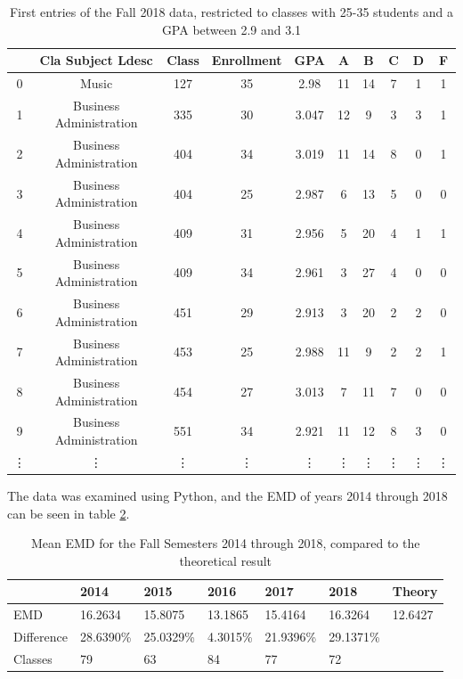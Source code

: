 \documentclass[12pt,letterpaper,oneside,openany]{book}
\begin{document}
\begin{table}[]
	\centering
	\begin{tabular}{c||ccccccccc}
		& Cla Subject Ldesc               & Class & Enrollment & GPA   & A    & B    & C   & D   & F   \\ \hline
		0  & Music                           & 127   & 35                & 2.98  & 11 & 14 & 7 & 1 & 1 \\
		1  & Business Administration         & 335   & 30                & 3.047 & 12 & 9  & 3 & 3 & 1 \\
		2  & Business Administration         & 404   & 34                & 3.019 & 11 & 14 & 8 & 0 & 1 \\
		3  & Business Administration         & 404   & 25                & 2.987 & 6  & 13 & 5 & 0 & 0 \\
		4  & Business Administration         & 409   & 31                & 2.956 & 5  & 20 & 4 & 1 & 1 \\
		5  & Business Administration         & 409   & 34                & 2.961 & 3  & 27 & 4 & 0 & 0 \\
		6  & Business Administration         & 451   & 29                & 2.913 & 3  & 20 & 2 & 2 & 0 \\
		7  & Business Administration         & 453   & 25                & 2.988 & 11 & 9  & 2 & 2 & 1 \\
		8  & Business Administration         & 454   & 27                & 3.013 & 7  & 11 & 7 & 0 & 0 \\
		9  & Business Administration         & 551   & 34                & 2.921 & 11 & 12 & 8 & 3 & 0 \\
		\vdots & \vdots & \vdots & \vdots & \vdots & \vdots & \vdots & \vdots & \vdots & \vdots \\
	\end{tabular}
	\caption{First entries of the Fall 2018 data, restricted to classes with 25-35 students and a GPA between 2.9 and 3.1}
	\label{tab:fall2018data}
\end{table}


The data was examined using Python, and the EMD of years 2014 through 2018 can be seen in table \ref{tab:emd_results}.

\begin{table}[]
	\centering
	\begin{tabular}{l||llllll}
		& 2014     & 2015     & 2016     & 2017     & 2018     & Theory \\ \hline
		EMD & 16.2634 & 15.8075 & 13.1865 & 15.4164 & 16.3264 & 12.6427           \\
		Difference & 28.6390\% & 25.0329\% & 4.3015\% & 21.9396\% & 29.1371\% \\
		Classes & 79 & 63 & 84 & 77 & 72 
	\end{tabular}
	\caption{Mean EMD for the Fall Semesters 2014 through 2018, compared to the theoretical result}
	\label{tab:emd_results}
\end{table}
\end{document}

